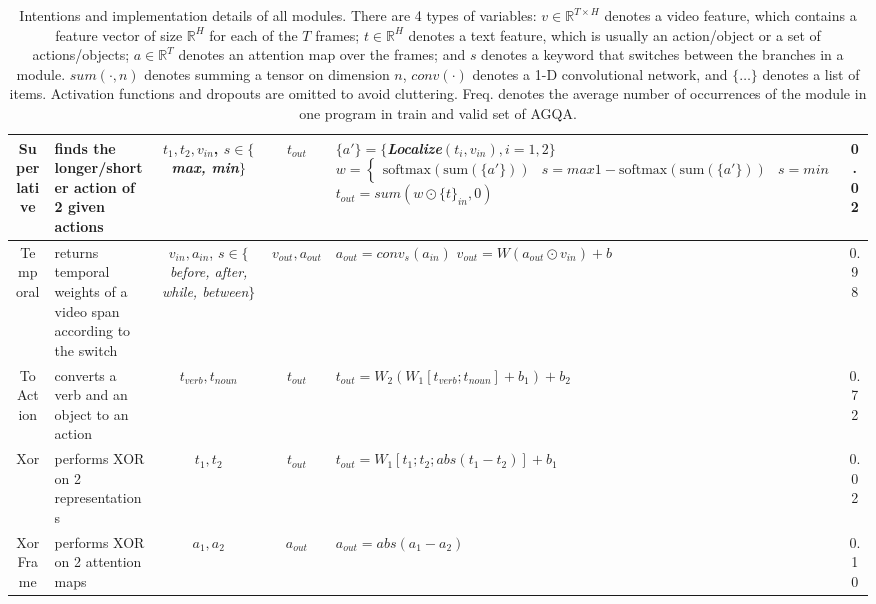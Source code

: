 \documentclass[letterpaper]{article} %
\begin{document}
\begin{table}[t]
{\begin{tabular}{cm{4cm}cclc}
        Superlative & finds the longer/shorter action of 2 given actions & \makecell[c]{$t_1, t_2, v_{in}$, \\ $s \in \{$\textit{max, min}$\}$} & $t_{out}$ & 
            \makecell[l]{
                $\{a'\}=\{$\textit{Localize}$(t_i, v_{in}), i=1,2\}$ \\
                $ w = \begin{cases}
                    \text{softmax}(\text{sum}(\{a'\})) & s=\mathit{max} \\
                    1-\text{softmax}(\text{sum}(\{a'\})) & s=\mathit{min} \\
                \end{cases} $ \\               
                $t_{out}=sum(w \odot \{t\}_{in},0)$ 
            } & 0.02 \\
        \hline
        
        Temporal & returns temporal weights of a video span according to the switch & \makecell[c]{$v_{in}, a_{in}$, \\ $s \in \{$\textit{before, after,} \\ \textit{while, between}$\}$} & $v_{out}, a_{out}$ & 
            \makecell[l]{
                $a_{out}=conv_{s}(a_{in})$ \\
                $v_{out}=W(a_{out} \odot v_{in})+b$ \\
            } & 0.98
        \\
        \hline
        
        ToAction & converts a verb and an object to an action & $t_{verb}, t_{noun}$ & $t_{out}$ & $t_{out}=W_2(W_1[t_{verb};t_{noun}]+b_1)+b_2$ & 0.72 \\
        \hline
        
        Xor & performs XOR on 2 representations & $t_1, t_2$ & $t_{out}$ & $t_{out}=W_1[t_1;t_2; abs(t_1-t_2)]+b_1$ & 0.02 \\
        \hline
        
        XorFrame & performs XOR on 2 attention maps & $a_1, a_2$ & $a_{out}$ & $a_{out}=abs(a_1-a_2)$ & 0.10 \\
        \hline
    \end{tabular}
}
    \caption{Intentions and implementation details of all modules. There are 4 types of variables: $v \in \mathbb{R}^{T \times H}$ denotes a video feature, which contains a feature vector of size $\mathbb{R}^H$ for each of the $T$ frames; $t \in \mathbb{R}^H$ denotes a text feature, which is usually an action/object or a set of actions/objects; $a \in \mathbb{R}^T$ denotes an attention map over the frames; and $s$ denotes a keyword that switches between the branches in a module. $sum(\cdot, n)$ denotes summing a tensor on dimension $n$, $conv(\cdot)$ denotes a 1-D convolutional network, and $\{\dotsc\}$ denotes a list of items. Activation functions and dropouts are omitted to avoid cluttering. Freq. denotes the average number of occurrences of the module in one program in train and valid set of AGQA.}
    \label{tab:modules}
\end{table}
\end{document}
